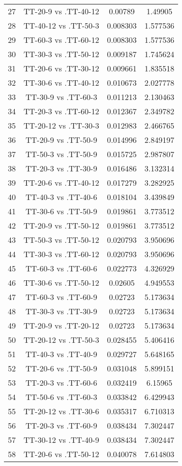 \documentclass[a4paper,10pt]{article}
\begin{document}
\begin{landscape}
\begin{table}[!htp]
\begin{tabular}{cccc}
27&TT-20-9 vs .TT-40-12&0.00789&1.49905\\
28&TT-40-12 vs .TT-50-3&0.008303&1.577536\\
29&TT-60-3 vs .TT-60-12&0.008303&1.577536\\
30&TT-30-3 vs .TT-50-12&0.009187&1.745624\\
31&TT-20-6 vs .TT-30-12&0.009661&1.835518\\
32&TT-30-6 vs .TT-40-12&0.010673&2.027778\\
33&TT-30-9 vs .TT-60-3&0.011213&2.130463\\
34&TT-20-3 vs .TT-60-12&0.012367&2.349782\\
35&TT-20-12 vs .TT-30-3&0.012983&2.466765\\
36&TT-20-9 vs .TT-50-9&0.014996&2.849197\\
37&TT-50-3 vs .TT-50-9&0.015725&2.987807\\
38&TT-20-3 vs .TT-30-9&0.016486&3.132314\\
39&TT-20-6 vs .TT-40-12&0.017279&3.282925\\
40&TT-40-3 vs .TT-40-6&0.018104&3.439849\\
41&TT-30-6 vs .TT-50-9&0.019861&3.773512\\
42&TT-20-9 vs .TT-50-12&0.019861&3.773512\\
43&TT-50-3 vs .TT-50-12&0.020793&3.950696\\
44&TT-30-3 vs .TT-60-12&0.020793&3.950696\\
45&TT-60-3 vs .TT-60-6&0.022773&4.326929\\
46&TT-30-6 vs .TT-50-12&0.02605&4.949553\\
47&TT-60-3 vs .TT-60-9&0.02723&5.173634\\
48&TT-30-3 vs .TT-30-9&0.02723&5.173634\\
49&TT-20-9 vs .TT-20-12&0.02723&5.173634\\
50&TT-20-12 vs .TT-50-3&0.028455&5.406416\\
51&TT-40-3 vs .TT-40-9&0.029727&5.648165\\
52&TT-20-6 vs .TT-50-9&0.031048&5.899151\\
53&TT-20-3 vs .TT-60-6&0.032419&6.15965\\
54&TT-50-6 vs .TT-60-3&0.033842&6.429943\\
55&TT-20-12 vs .TT-30-6&0.035317&6.710313\\
56&TT-20-3 vs .TT-60-9&0.038434&7.302447\\
57&TT-30-12 vs .TT-40-9&0.038434&7.302447\\
58&TT-20-6 vs .TT-50-12&0.040078&7.614803\\

\end{tabular}
\end{table}
\end{landscape}
\end{document}
